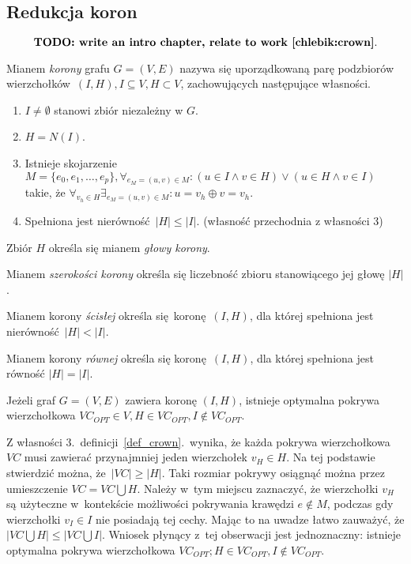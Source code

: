 \subsection{Redukcja koron}\label{ss_kernelization_crown_reduction}
\par{
  \[\textbf{TODO: write an intro chapter, relate to work~\cite{chlebik:crown}}.\]
}
\begin{definition}
  Mianem \emph{korony} grafu $G=(V, E)$ nazywa się uporządkowaną parę
  podzbiorów wierzchołków $(I, H), I \subseteq V, H \subset V$, zachowujących
  następujące własności.
  \begin{enumerate}
    \item $I \neq \emptyset$ stanowi zbiór niezależny w $G$.
    \item $H=N(I)$.
    \item Istnieje skojarzenie $M=\{e_0, e_1, \ldots, e_p\}, \forall_{e_M=(u,v) \in
      M}: (u\in I \land v\in H) \lor (u \in H \land v \in I)$ takie, że
      $\forall_{v_h \in H}\exists_{e_M=(u,v)\in M}: u = v_h \oplus v = v_h$.
    \item Spełniona jest nierówność $|H| \leq |I|$. (własność przechodnia z własności 3)
  \end{enumerate}
\end{definition}
\begin{definition}
  Zbiór $H$ określa się mianem \emph{głowy korony}.
\end{definition}
\begin{definition}
  Mianem \emph{szerokości korony} określa się liczebność zbioru stanowiącego jej głowę $|H|$.
\end{definition}
\begin{definition}
  Mianem korony \emph{ścisłej} określa się koronę $(I, H)$, dla której spełniona jest nierówność $|H| < |I|$.
\end{definition}
\begin{definition}
  Mianem korony \emph{równej} określa się koronę $(I, H)$, dla której spełniona jest równość $|H| = |I|$.
\end{definition}
\begin{theorem}
  Jeżeli graf $G=(V,E)$ zawiera koronę $(I,H)$, istnieje optymalna pokrywa 
  wierzchołkowa $VC_{OPT} \in V, H \in VC_{OPT}, I \notin VC_{OPT}$.
\end{theorem}
\begin{bproof}
  Z własności 3.\ definicji~\ref{def_crown}.\ wynika, że każda pokrywa 
  wierzchołkowa $VC$ musi zawierać przynajmniej jeden wierzchołek $v_H \in H$.
  Na tej podstawie stwierdzić można, że $|VC|\geq|H|$.
  Taki rozmiar pokrywy osiągnąć można przez umieszczenie $VC=VC\bigcup H$.
  Należy w~tym miejscu zaznaczyć, że wierzchołki $v_H$ są użyteczne w~kontekście
  możliwości pokrywania krawędzi $e \notin M$, podczas gdy wierzchołki $v_I \in
  I$ nie posiadają tej cechy.
  Mając to na uwadze łatwo zauważyć, że $|VC \bigcup H| \leq |VC \bigcup
  I|$.
  Wniosek płynący z~tej obserwacji jest jednoznaczny: istnieje optymalna pokrywa
  wierzchołkowa $VC_{OPT}; H \in VC_{OPT}, I \notin VC_{OPT}$.
\end{bproof}
